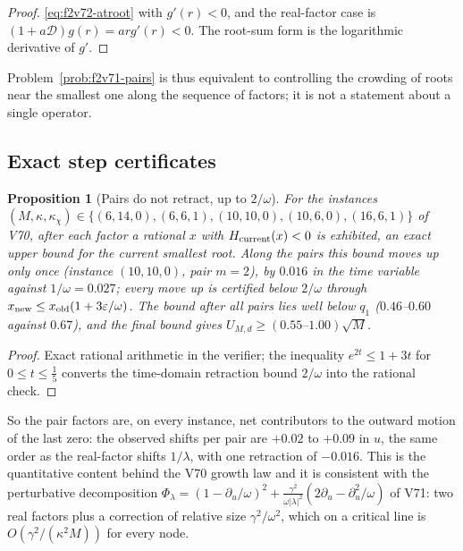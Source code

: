 \documentclass[11pt]{article}
\newtheorem{proposition}[theorem]{Proposition}
\theoremstyle{definition}
\theoremstyle{remark}
\begin{document}
\begin{proof}
\eqref{eq:f2v72-atroot} with \(g'(r)<0\), and the real-factor case is
\((1+a\mathcal D)g(r)=arg'(r)<0\).  The root-sum form is the logarithmic
derivative of \(g'\).
\end{proof}

Problem~\ref{prob:f2v71-pairs} is thus equivalent to controlling the
crowding of roots near the smallest one along the sequence of factors;
it is not a statement about a single operator.

\subsection{Exact step certificates}

\begin{proposition}[Pairs do not retract, up to \(2/\omega\)]
\label{prop:f2v72-steps}
For the instances \((M,\kappa,\kappa_\chi)\in\{(6,14,0),(6,6,1),(10,10,0),(10,6,0),(16,6,1)\}\)
of V70, after each factor a rational \(x\) with \(H_{\rm current}(x)<0\)
is exhibited, an exact upper bound for the current smallest root.  Along
the pairs this bound moves up only once (instance \((10,10,0)\), pair
\(m=2\)), by \(0.016\) in the time variable against \(1/\omega=0.027\);
every move up is certified below \(2/\omega\) through
\(x_{\rm new}\le x_{\rm old}(1+3\varepsilon/\omega)\).  The bound after
all pairs lies well below \(q_1\) (\(0.46\)--\(0.60\) against
\(0.67\)), and the final bound gives \(U_{M,d}\ge(0.55\text{--}1.00)\sqrt M\).
\end{proposition}

\begin{proof}
Exact rational arithmetic in the verifier; the inequality
\(e^{2t}\le1+3t\) for \(0\le t\le\tfrac15\) converts the time-domain
retraction bound \(2/\omega\) into the rational check.
\end{proof}

So the pair factors are, on every instance, net contributors to the
outward motion of the last zero: the observed shifts per pair are
\(+0.02\) to \(+0.09\) in \(u\), the same order as the real-factor shifts
\(1/\lambda\), with one retraction of \(-0.016\).  This is the
quantitative content behind the V70 growth law and it is consistent with
the perturbative decomposition
\(\Phi_\lambda=(1-\partial_u/\omega)^2+\frac{\gamma^2}{\omega|\lambda|^2}(2\partial_u-\partial_u^2/\omega)\)
of V71: two real factors plus a correction of relative size
\(\gamma^2/\omega^2\), which on a critical line is \(O(\gamma^2/(\kappa^2M))\)
for every node.
\end{document}
